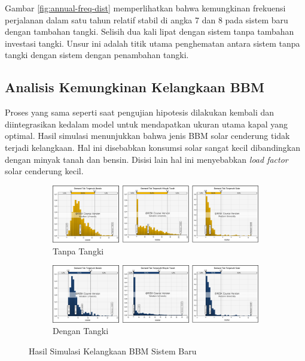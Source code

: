 Gambar \ref{fig:annual-freq-dist} memperlihatkan bahwa kemungkinan frekuensi perjalanan dalam satu tahun relatif stabil di angka 7 dan 8 pada sistem baru dengan tambahan tangki. Selisih dua kali lipat dengan sistem tanpa tambahan investasi tangki. Unsur ini adalah titik utama penghematan antara sistem tanpa tangki dengan sistem dengan penambahan tangki.


\subsection{Analisis Kemungkinan Kelangkaan BBM}
\label{subsec:stock-out-over-capacity}

Proses yang sama seperti saat pengujian hipotesis dilakukan kembali dan diintegrasikan kedalam model untuk mendapatkan ukuran utama kapal yang optimal. Hasil simulasi menunjukkan bahwa jenis BBM solar cenderung tidak terjadi kelangkaan. Hal ini disebabkan konsumsi solar sangat kecil dibandingkan dengan minyak tanah dan bensin. Disisi lain hal ini menyebabkan \emph{load factor} solar cenderung kecil.

\begin{figure}[!ht]
    \centering
    \begin{subfigure}{0.95\textwidth}
        \centering
        \includegraphics[width=\textwidth]{grafik/minus-bbm-baru.jpg}
        \caption{Tanpa Tangki}
    \end{subfigure}
    
    \vspace{0.3cm}  %
    
    \begin{subfigure}{0.95\textwidth}
        \centering
        \includegraphics[width=\textwidth]{grafik/minus-bbm-baru-tangki.jpg}
        \caption{Dengan Tangki}    
    \end{subfigure}
    \caption{Hasil Simulasi Kelangkaan BBM Sistem Baru}
    \label{fig:minus-bbm-baru}
\end{figure}

